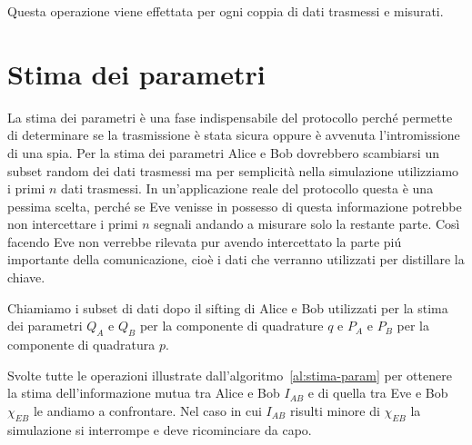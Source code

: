 Questa operazione viene effettata per ogni coppia di dati trasmessi e misurati.

\section{Stima dei parametri}
La stima dei parametri \`e una fase indispensabile del protocollo perch\'e permette di determinare se la trasmissione \`e stata sicura oppure \`e avvenuta l'intromissione di una spia. Per la stima dei parametri Alice e Bob dovrebbero scambiarsi un subset random dei dati trasmessi ma per semplicit\`a nella simulazione utilizziamo i primi $n$ dati trasmessi. In un'applicazione reale del protocollo questa \`e una pessima scelta, perch\'e se Eve venisse in possesso di questa informazione potrebbe non intercettare i primi $n$ segnali andando a misurare solo la restante parte. Cos\`i facendo Eve non verrebbe rilevata pur avendo intercettato la parte pi\'u importante della comunicazione, cio\`e i dati che verranno utilizzati per distillare la chiave.

Chiamiamo i subset di dati dopo il sifting di Alice e Bob utilizzati per la stima dei parametri $Q_A$ e $Q_B$ per la componente di quadrature $q$ e $P_A$ e $P_B$ per la componente di quadratura $p$.

Svolte tutte le operazioni illustrate dall'algoritmo~\ref{al:stima-param} per ottenere la stima dell'informazione mutua tra Alice e Bob $I_{AB}$ e di quella tra Eve e Bob $\chi_{EB}$ le andiamo a confrontare. Nel caso in cui $I_{AB}$ risulti minore di $\chi_{EB}$ la simulazione si interrompe e deve ricominciare da capo.

